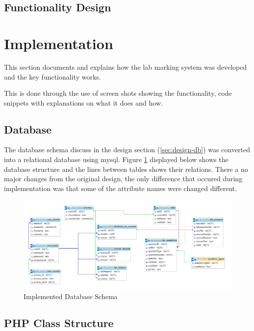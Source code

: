 \documentclass[12pt]{article}  %
\begin{document}
\subsection{Functionality Design}







\newpage
\section{Implementation}
This section documents and explains how the lab marking system was developed and the key functionality works. 

This is done through the use of screen shots showing the functionality, code snippets with explanations on what it does and how.   

\subsection{Database}

The database schema discuss in the design section (\ref{sec:design-db}) was converted into a relational database using mysql. Figure \ref{fig:implement-db} displayed below shows the database structure and the lines between tables shows their relations. There a no major changes from the original design, the only difference that occured during implementation was that some of the attribute names were changed different.  

\begin{figure}[H]
    \centering
    \includegraphics[width=1\textwidth]{images/implementation/database.png}
    \caption{Implemented Database Schema}
    \label{fig:implement-db}
\end{figure}

\subsection{PHP Class Structure}
\end{document}
